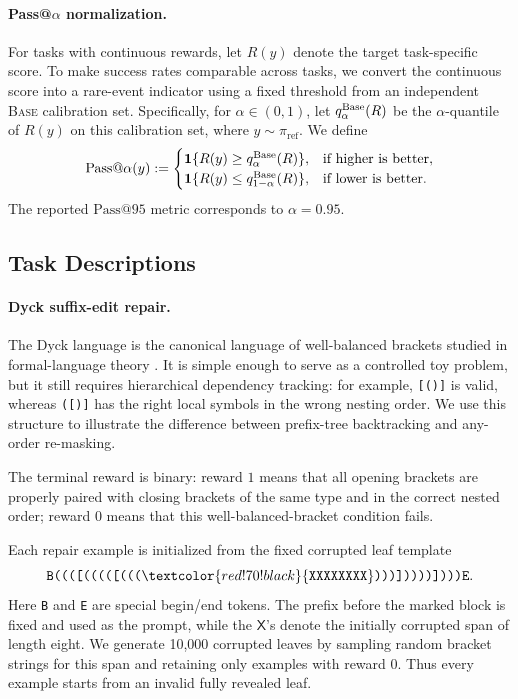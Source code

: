 \documentclass{article}
\numberwithin{theorem}{section}
\numberwithin{proposition}{section}
\numberwithin{corollary}{section}
\numberwithin{lemma}{section}
\numberwithin{conjecture}{section}
\numberwithin{remark}{section}
\numberwithin{definition}{section}
\numberwithin{assumption}{section}
\numberwithin{example}{section}
\providecommand{\base}{\pi_{\mathrm{ref}}}
\begin{document}
\paragraph{Pass@$\alpha$ normalization.}
For tasks with continuous rewards, let $R(y)$ denote the target task-specific score. To make success rates comparable across tasks, we convert the continuous score into a rare-event indicator using a fixed threshold from an independent \textsc{Base} calibration set. Specifically, for $\alpha\in(0,1)$, let $q_\alpha^{\rm Base}(R)$ be the $\alpha$-quantile of $R(y)$ on this calibration set, where $y\sim\base$. We define
\begin{equation*}
    \mathrm{Pass@\alpha}(y)
:=
    \begin{cases}
        \mathbf 1\{R(y)\ge q_{\alpha}^{\rm Base}(R)\},
        & \text{if higher is better},\\
        \mathbf 1\{R(y)\le q_{1-\alpha}^{\rm Base}(R)\},
        & \text{if lower is better}.
    \end{cases}
\end{equation*}
The reported $\mathrm{Pass@95}$ metric corresponds to $\alpha=0.95$.

\subsection{Task Descriptions}
\label{app:task_descriptions}

\paragraph{Dyck suffix-edit repair.}
The Dyck language is the canonical language of well-balanced brackets studied in formal-language theory \citep{chomsky1963algebraic}. It is simple enough to serve as a controlled toy problem, but it still requires hierarchical dependency tracking: for example, \texttt{[()]} is valid, whereas \texttt{([)]} has the right local symbols in the wrong nesting order. We use this structure to illustrate the difference between prefix-tree backtracking and any-order re-masking.

The terminal reward is binary: reward $1$ means that all opening brackets are properly paired with closing brackets of the same type and in the correct nested order; reward $0$ means that this well-balanced-bracket condition fails.

Each repair example is initialized from the fixed corrupted leaf template
\begin{equation*}
    \texttt{B((([(((([(((}\textcolor{red!70!black}{\texttt{XXXXXXXX}}\texttt{)))]))))])))E}.
\end{equation*}
Here \texttt{B} and \texttt{E} are special begin/end tokens. The prefix before the marked block is fixed and used as the prompt, while the
\textcolor{red!70!black}{$\mathsf{X}$}'s denote the initially corrupted span of
length eight. We generate 10,000 corrupted leaves by sampling random bracket strings for this span and retaining only examples with reward $0$. Thus every example starts from an invalid fully revealed leaf.
\end{document}
